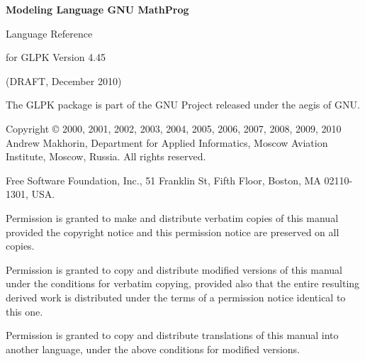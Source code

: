 \documentclass[10pt]{article}
\begin{document}
\thispagestyle{empty}

\begin{center}

\vspace*{1in}

\begin{huge}
\sf\bfseries Modeling Language GNU MathProg
\end{huge}

\vspace{0.5in}

\begin{LARGE}
\sf Language Reference
\end{LARGE}

\vspace{0.5in}

\begin{LARGE}
\sf for GLPK Version 4.45
\end{LARGE}

\vspace{0.5in}
\begin{Large}
\sf (DRAFT, December 2010)
\end{Large}

\end{center}

\newpage

\vspace*{1in}

\vfill

\noindent
The GLPK package is part of the GNU Project released under the aegis of
GNU.

\medskip\noindent
Copyright \copyright{} 2000, 2001, 2002, 2003, 2004, 2005, 2006, 2007,
2008, 2009, 2010 Andrew Makhorin, Department for Applied Informatics,
Moscow Aviation Institute, Moscow, Russia. All rights reserved.

\medskip\noindent
Free Software Foundation, Inc., 51 Franklin St, Fifth Floor, Boston,
MA 02110-1301, USA.

\medskip\noindent
Permission is granted to make and distribute verbatim copies of this
manual provided the copyright notice and this permission notice are
preserved on all copies.

\medskip\noindent
Permission is granted to copy and distribute modified versions of this
manual under the conditions for verbatim copying, provided also that
the entire resulting derived work is distributed under the terms of
a permission notice identical to this one.

\medskip\noindent
Permission is granted to copy and distribute translations of this
manual into another language, under the above conditions for modified
versions.
\end{document}
